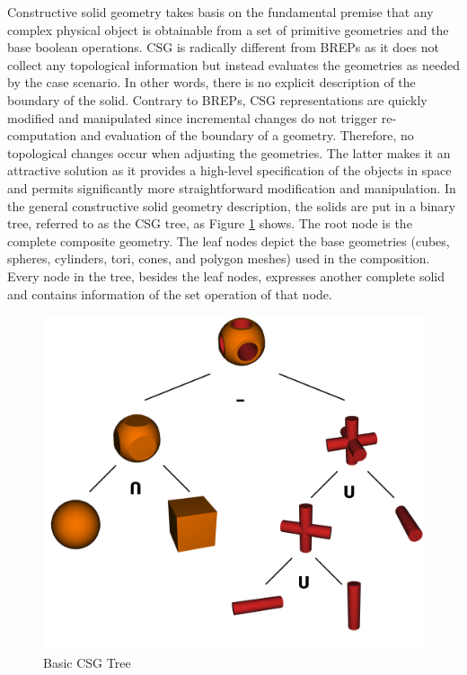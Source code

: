 \documentclass[a4paper,11pt,oneside]{article}
\begin{document}
Constructive solid geometry takes basis on the fundamental premise that any complex physical object is obtainable from a set of primitive geometries and the base boolean operations. CSG is radically different from BREPs as it does not collect any topological information but instead evaluates the geometries as needed by the case scenario. In other words, there is no explicit description of the boundary of the solid. Contrary to BREPs,  CSG representations are quickly modified and manipulated since incremental changes do not trigger re-computation and evaluation of the boundary of a geometry. Therefore, no topological changes occur when adjusting the geometries. The latter makes it an attractive solution as it provides a high-level specification of the objects in space and permits significantly more straightforward modification and manipulation. In the general constructive solid geometry description, the solids are put in a binary tree, referred to as the CSG tree, as Figure \ref{fig3:sample_csg_tree} shows. The root node is the complete composite geometry. The leaf nodes depict the base geometries (cubes, spheres, cylinders, tori, cones, and polygon meshes) used in the composition. Every node in the tree, besides the leaf nodes, expresses another complete solid and contains information of the set operation of that node.
    
\begin{figure}[ht]
	\begin{center}
		\includegraphics[width=.8\textwidth]{intro-figures/figure3.png}
	\end{center}
	\caption{Basic CSG Tree}
	\label{fig3:sample_csg_tree}
\end{figure}
  
\end{document}
